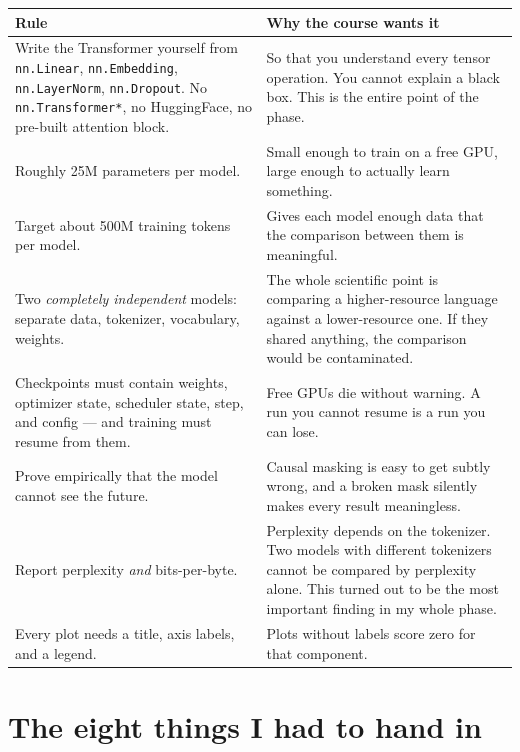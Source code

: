 \documentclass[11pt]{report}
\newcommand{\p}[1]{\texttt{#1}}
\begin{document}
\begin{longtable}{p{}p{}}
\toprule
\textbf{Rule} & \textbf{Why the course wants it} \\
\midrule
\endhead
Write the Transformer yourself from \p{nn.Linear}, \p{nn.Embedding},
\p{nn.LayerNorm}, \p{nn.Dropout}. No \p{nn.Transformer*}, no HuggingFace, no
pre-built attention block.
& So that you understand every tensor operation. You cannot explain a black box.
This is the entire point of the phase. \\
\addlinespace
Roughly 25M parameters per model.
& Small enough to train on a free GPU, large enough to actually learn something. \\
\addlinespace
Target about 500M training tokens per model.
& Gives each model enough data that the comparison between them is meaningful. \\
\addlinespace
Two \emph{completely independent} models: separate data, tokenizer, vocabulary,
weights.
& The whole scientific point is comparing a higher-resource language against a
lower-resource one. If they shared anything, the comparison would be
contaminated. \\
\addlinespace
Checkpoints must contain weights, optimizer state, scheduler state, step, and
config --- and training must resume from them.
& Free GPUs die without warning. A run you cannot resume is a run you can lose. \\
\addlinespace
Prove empirically that the model cannot see the future.
& Causal masking is easy to get subtly wrong, and a broken mask silently makes
every result meaningless. \\
\addlinespace
Report perplexity \emph{and} bits-per-byte.
& Perplexity depends on the tokenizer. Two models with different tokenizers
cannot be compared by perplexity alone. This turned out to be the most important
finding in my whole phase. \\
\addlinespace
Every plot needs a title, axis labels, and a legend.
& Plots without labels score zero for that component. \\
\bottomrule
\end{longtable}

\section{The eight things I had to hand in}
\end{document}
